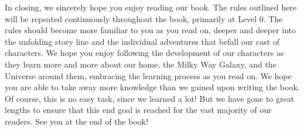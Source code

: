 \documentclass[main.tex]{subfiles}
\begin{document}
\par \nar In closing, we sincerely hope you enjoy reading our book.  The rules outlined here will be repeated continuously throughout the book, primarily at Level 0.  The rules should become more familiar to you as you read on, deeper and deeper into the unfolding story line and the individual adventures that befall our cast of characters.  We hope you enjoy following the development of our characters as they learn more and more about our home, the Milky Way Galaxy, and the Universe around them, embracing the learning process as you read on.  We hope you are able to take away more knowledge than we gained upon writing the book.  Of course, this is no easy task, since we learned a lot!  But we have gone to great lengths to ensure that this end goal is reached for the vast majority of our readers.  See you at the end of the book!

\end{document}
